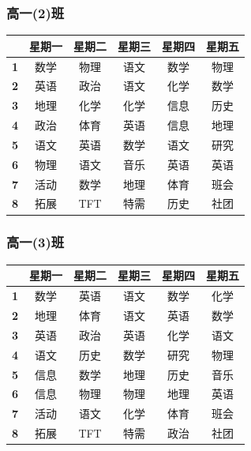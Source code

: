 \documentclass[a4paper]{article}
\begin{document}
  \subsubsection{高一(2)班}
   \begin{tabular}{|c|c|c|c|c|c|}
   \hline
   & \bf 星期一 & \bf 星期二 & \bf 星期三 & \bf 星期四 & \bf 星期五 \\\hline
   \bf 1 & 数学 & 物理 & 语文 & 数学 & 物理 \\\hline
   \bf 2 & 英语 & 政治 & 语文 & 化学 & 数学 \\\hline
   \bf 3 & 地理 & 化学 & 化学 & 信息 & 历史 \\\hline
   \bf 4 & 政治 & 体育 & 英语 & 信息 & 地理 \\\hline
   \bf 5 & 语文 & 英语 & 数学 & 语文 & 研究 \\\hline
   \bf 6 & 物理 & 语文 & 音乐 & 英语 & 英语 \\\hline
   \bf 7 & 活动 & 数学 & 地理 & 体育 & 班会 \\\hline
   \bf 8 & 拓展 & TFT  & 特需 & 历史 & 社团 \\\hline
   \end{tabular}
  \subsubsection{高一(3)班}
   \begin{tabular}{|c|c|c|c|c|c|}
   \hline
   & \bf 星期一 & \bf 星期二 & \bf 星期三 & \bf 星期四 & \bf 星期五 \\\hline
   \bf 1 & 数学 & 英语 & 语文 & 数学 & 化学 \\\hline
   \bf 2 & 地理 & 体育 & 语文 & 英语 & 数学 \\\hline
   \bf 3 & 英语 & 政治 & 英语 & 化学 & 语文 \\\hline
   \bf 4 & 语文 & 历史 & 数学 & 研究 & 物理 \\\hline
   \bf 5 & 信息 & 数学 & 地理 & 历史 & 音乐 \\\hline
   \bf 6 & 信息 & 物理 & 物理 & 地理 & 英语 \\\hline
   \bf 7 & 活动 & 语文 & 化学 & 体育 & 班会 \\\hline
   \bf 8 & 拓展 & TFT  & 特需 & 政治 & 社团 \\\hline
   \end{tabular}
  \clearpage
\end{document}
